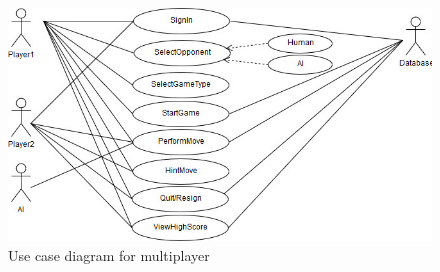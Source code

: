 \documentclass{article}
\begin{document}
\begin{figure}[h]
	\includegraphics*[scale=0.8]{User_case_diagram_1.jpg}
	\caption{Use case diagram for multiplayer}
	
\end{figure}
\end{document}
